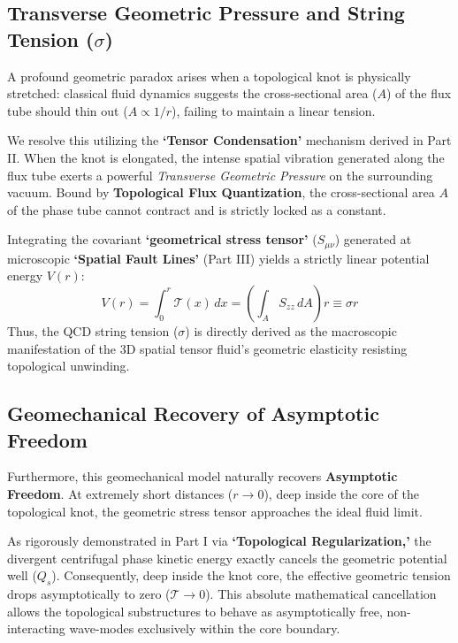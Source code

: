 \documentclass[reprint,amsmath,amssymb,aps,prd]{revtex4-2}
\begin{document}
\subsection{Transverse Geometric Pressure and String Tension ($\sigma$)}
A profound geometric paradox arises when a topological knot is physically stretched: classical fluid dynamics suggests the cross-sectional area ($A$) of the flux tube should thin out ($A \propto 1/r$), failing to maintain a linear tension.

We resolve this utilizing the \textbf{`Tensor Condensation'} mechanism derived in Part II. When the knot is elongated, the intense spatial vibration generated along the flux tube exerts a powerful \textit{Transverse Geometric Pressure} on the surrounding vacuum. Bound by \textbf{Topological Flux Quantization}, the cross-sectional area $A$ of the phase tube cannot contract and is strictly locked as a constant.

Integrating the covariant \textbf{`geometrical stress tensor'} ($S_{\mu\nu}$) generated at microscopic \textbf{`Spatial Fault Lines'} (Part III) yields a strictly linear potential energy $V(r)$:
\begin{equation}
V(r) = \int_{0}^{r} \mathcal{T}(x) \, dx = \left( \int_A S_{zz} \, dA \right) r \equiv \sigma r
\end{equation}
Thus, the QCD string tension ($\sigma$) is directly derived as the macroscopic manifestation of the 3D spatial tensor fluid's geometric elasticity resisting topological unwinding.

\subsection{Geomechanical Recovery of Asymptotic Freedom}
Furthermore, this geomechanical model naturally recovers \textbf{Asymptotic Freedom}. At extremely short distances ($r \to 0$), deep inside the core of the topological knot, the geometric stress tensor approaches the ideal fluid limit.

As rigorously demonstrated in Part I via \textbf{`Topological Regularization,'} the divergent centrifugal phase kinetic energy exactly cancels the geometric potential well ($Q_s$). Consequently, deep inside the knot core, the effective geometric tension drops asymptotically to zero ($\mathcal{T} \to 0$). This absolute mathematical cancellation allows the topological substructures to behave as asymptotically free, non-interacting wave-modes exclusively within the core boundary.
\end{document}
